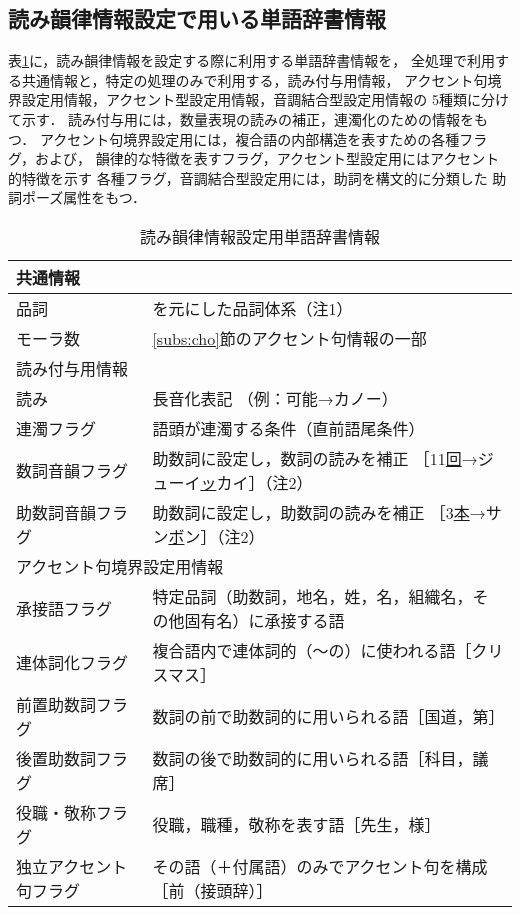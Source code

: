 \subsection{読み韻律情報設定で用いる単語辞書情報}
表\ref{tab:dic}に，読み韻律情報を設定する際に利用する単語辞書情報を，
全処理で利用する共通情報と，特定の処理のみで利用する，読み付与用情報，
アクセント句境界設定用情報，アクセント型設定用情報，音調結合型設定用情報の
5種類に分けて示す．
読み付与用には，数量表現の読みの補正，連濁化のための情報をもつ．
アクセント句境界設定用には，複合語の内部構造を表すための各種フラグ，および，
韻律的な特徴を表すフラグ，アクセント型設定用にはアクセント的特徴を示す
各種フラグ，音調結合型設定用には，助詞を構文的に分類した
助詞ポーズ属性をもつ．


\begin{table}[thb]
\caption{読み韻律情報設定用単語辞書情報}
\label{tab:dic}
\begin{center}
\begin{tabular}{|l|l|}\hline
\multicolumn{2}{|l|}{共通情報} \\ \hline
品詞	&  \cite{Miyazaki5}を元にした品詞体系（注1） \\
モーラ数	&  \ref{subs:cho}節のアクセント句情報の一部 \\ \hline
\multicolumn{2}{|l|}{読み付与用情報}  \\ \hline
読み	& 長音化表記 （例：可能→カノー）\\
連濁フラグ & 語頭が連濁する条件（直前語尾条件）\\
数詞音韻フラグ & 助数詞に設定し，数詞の読みを補正
［11\underline{回}→ジューイ\underline{ッ}カイ］（注2） \\
助数詞音韻フラグ & 助数詞に設定し，助数詞の読みを補正
［3\underline{本}→サン\underline{ボ}ン］（注2）\\ \hline
\multicolumn{2}{|l|}{アクセント句境界設定用情報} \\ \hline
承接語フラグ & \footnotesize{特定品詞（助数詞，地名，姓，名，組織名，その他固有名）に承接する語}\\
連体詞化フラグ & 複合語内で連体詞的（〜の）に使われる語［クリスマス］ \\
前置助数詞フラグ & 数詞の前で助数詞的に用いられる語［国道，第］ \\
後置助数詞フラグ & 数詞の後で助数詞的に用いられる語［科目，議席］ \\
役職・敬称フラグ & 役職，職種，敬称を表す語［先生，様］ \\
独立アクセント句フラグ & その語（＋付属語）のみでアクセント句を構成
［前（接頭辞）］\\

\end{tabular}
\end{center}
\end{table}
